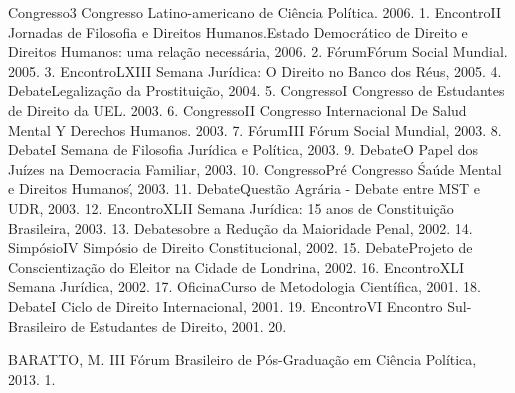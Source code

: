 

\begin{cvhonors}
  \cvhonor
    {Congresso}{3 Congresso Latino-americano de Ciência Política. 2006.}
    {}
    {1.}
  \cvhonor
    {Encontro}{II Jornadas de Filosofia e Direitos Humanos.Estado Democrático de Direito e Direitos Humanos: uma relação necessária, 2006.}
    {}
    {2.}
  \cvhonor
    {Fórum}{Fórum Social Mundial. 2005.}
    {}
    {3.}
  \cvhonor
    {Encontro}{LXIII Semana Jurídica: O Direito no Banco dos Réus, 2005.}
    {}
    {4.}
  \cvhonor
    {Debate}{Legalização da Prostituição, 2004.}
    {}
    {5.}
  \cvhonor
    {Congresso}{I Congresso de Estudantes de Direito da UEL. 2003.}
    {}
    {6.}
  \cvhonor
    {Congresso}{II Congresso Internacional De Salud Mental Y Derechos Humanos. 2003.}
    {}
    {7.}
  \cvhonor
    {Fórum}{III Fórum Social Mundial, 2003.}
    {}
    {8.}
  \cvhonor
    {Debate}{I Semana de Filosofia Jurídica e Política, 2003.}
    {}
    {9.}
  \cvhonor
    {Debate}{O Papel dos Juízes na Democracia Familiar, 2003.}
    {}
    {10.}
  \cvhonor
    {Congresso}{Pré Congresso \'Saúde Mental e Direitos Humanos\', 2003.}
    {}
    {11.}
  \cvhonor
    {Debate}{Questão Agrária - Debate entre MST e UDR, 2003.}
    {}
    {12.}
  \cvhonor
    {Encontro}{XLII Semana Jurídica: 15 anos de Constituição Brasileira, 2003.}
    {}
    {13.}
  \cvhonor
    {Debate}{sobre a Redução da Maioridade Penal, 2002.}
    {}
    {14.}
  \cvhonor
    {Simpósio}{IV Simpósio de Direito Constitucional, 2002.}
    {}
    {15.}
  \cvhonor
    {Debate}{Projeto de Conscientização do Eleitor na Cidade de Londrina, 2002.}
    {}
    {16.}
  \cvhonor
    {Encontro}{XLI Semana Jurídica, 2002.}
    {}
    {17.}
  \cvhonor
    {Oficina}{Curso de Metodologia Científica, 2001.}
    {}
    {18.}
  \cvhonor
    {Debate}{I Ciclo de Direito Internacional, 2001.}
    {}
    {19.}
  \cvhonor
    {Encontro}{VI Encontro Sul-Brasileiro de Estudantes de Direito, 2001.}
    {}
    {20.}
\end{cvhonors}


\begin{cvhonors}
  \cvhonor
    {BARATTO, M.}
    {III Fórum Brasileiro de Pós-Graduação em Ciência Política, 2013.}
    {}
    {1. }
\end{cvhonors}
